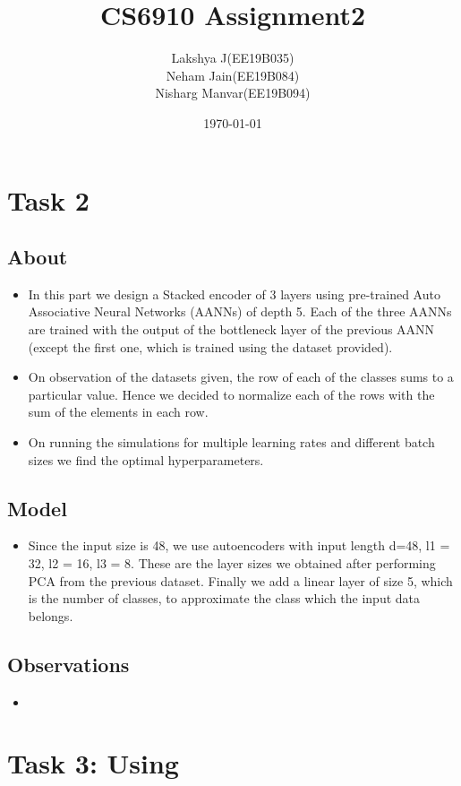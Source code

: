 \documentclass{article}
\title{CS6910 Assignment2}
\author{Lakshya J(EE19B035)\\ Neham Jain(EE19B084)\\ Nisharg Manvar(EE19B094)}
\date{\today}
\begin{document}
\maketitle

\section{Task 2}
\subsection{About}
\begin{itemize}
    \item In this part we design a Stacked encoder of 3 layers using pre-trained Auto Associative Neural Networks (AANNs) of depth 5. Each of the three AANNs are trained with the output of the bottleneck layer of the previous AANN (except the first one, which is trained using the dataset provided).
    \item On observation of the datasets given, the row of each of the classes sums to a particular value. Hence we decided to normalize each of the rows with the sum of the elements in each row.
    \item On running the simulations for multiple learning rates and different batch sizes we find the optimal hyperparameters.
\end{itemize}

\subsection{Model}
\begin{itemize}
    \item Since the input size is 48, we use autoencoders with input length d=48, l1 = 32, l2 = 16, l3 = 8. These are the layer sizes we obtained after performing PCA from the previous dataset. Finally we add a linear layer of size 5, which is the number of classes, to approximate the class which the input data belongs.
\end{itemize}

\subsection{Observations}
\begin{itemize}
    \item 
\end{itemize}


\section{Task 3: Using }
\end{document}
